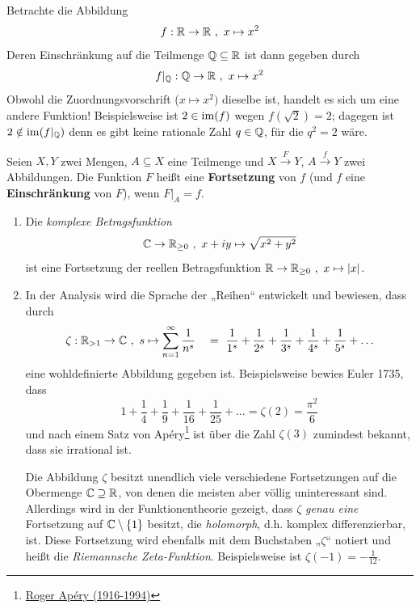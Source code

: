 \begin{bsp}
    Betrachte die Abbildung
        \[ f : \R \to \R \ ,\ x \mapsto x^2 \]
    Deren Einschränkung auf die Teilmenge $\mathbb Q\subseteq \mathbb R$ ist dann gegeben durch
        \[ f\vert_{\mathbb Q} : \mathbb Q \to \mathbb R \ ,\ x\mapsto x^2 \]
    Obwohl die Zuordnungsvorschrift ($x\mapsto x^2)$ dieselbe ist, handelt es sich um eine andere Funktion! Beispielsweise ist $2\in \operatorname{im}(f)$ wegen $f(\sqrt{2})=2$; dagegen ist $2\notin \operatorname{im}(f\vert_\mathbb Q)$ denn es gibt keine rationale Zahl $q\in \mathbb Q$, für die $q^2=2$ wäre.
\end{bsp}
 
 
\begin{defin} \label{def:fortsetzung}  
    Seien $X,Y$ zwei Mengen, $A\subseteq X$ eine Teilmenge und $X\xrightarrow{F} Y$, $A\xrightarrow{f} Y$ zwei Abbildungen. Die Funktion $F$ heißt eine \textbf{Fortsetzung} von $f$ (und $f$ eine \textbf{Einschränkung} von $F$), wenn $F\vert_A=f$.
\end{defin}


\begin{bsp} \quad
    \begin{enumerate}
        \item Die \emph{komplexe Betragsfunktion}
            \[ \mathbb C \to \mathbb R_{\ge 0} \ ,\ x+iy \mapsto \sqrt{x^2+y^2} \]
        ist eine Fortsetzung der reellen Betragsfunktion $\mathbb R\to \mathbb R_{\ge 0} \ ,\ x\mapsto \vert x\vert$.
        \item In der Analysis wird die Sprache der „Reihen“ entwickelt und bewiesen, dass durch
            \[ \zeta : \mathbb R_{>1} \to \mathbb C \ ,\ s \mapsto \sum_{n=1}^\infty \frac{1}{n^s} \quad =\  \frac{1}{1^s} + \frac{1}{2^s} + \frac{1}{3^s} + \frac{1}{4^s} + \frac{1}{5^s} + \ldots\]
        eine wohldefinierte Abbildung gegeben ist. Beispielsweise bewies Euler 1735, dass
            \[ 1 + \frac{1}{4} + \frac{1}{9} + \frac{1}{16} + \frac{1}{25} + \ldots = \zeta(2) = \frac{\pi^2}{6} \]
        und nach einem Satz von Apéry\footnote{\href{https://de.wikipedia.org/wiki/Roger Apery}{Roger Apéry (1916-1994)}} ist über die Zahl $\zeta(3)$ zumindest bekannt, dass sie irrational ist.

        Die Abbildung $\zeta$ besitzt unendlich viele verschiedene Fortsetzungen auf die Obermenge $\mathbb C \supseteq \mathbb R$, von denen die meisten aber völlig uninteressant sind. Allerdings wird in der Funktionentheorie gezeigt, dass $\zeta$ \emph{genau eine} Fortsetzung auf $\mathbb C\setminus \{1\}$ besitzt, die \emph{holomorph}, d.h. komplex differenzierbar, ist. Diese Fortsetzung wird ebenfalls mit dem Buchstaben „$\zeta$“ notiert und heißt die \emph{Riemannsche Zeta-Funktion}. Beispielsweise ist $\zeta(-1)=-\frac{1}{12}$.
    \end{enumerate}
\end{bsp}


